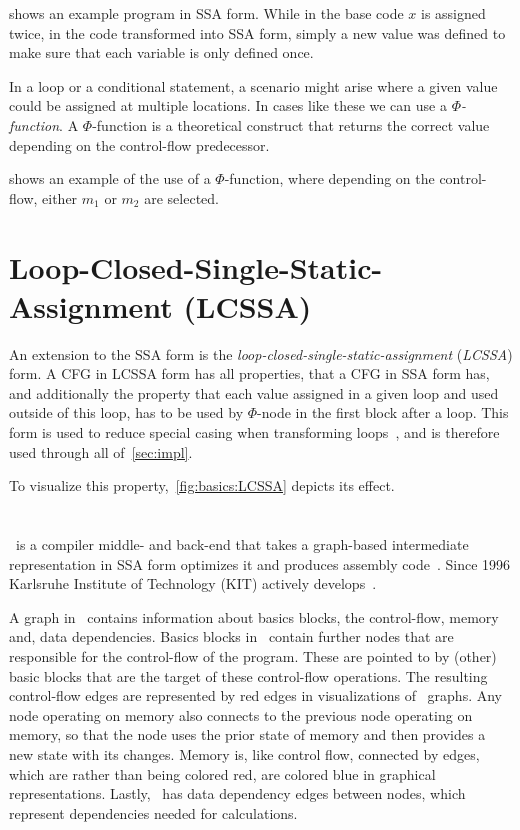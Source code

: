  shows an example program in SSA form.
While in the base code $x$ is assigned twice, in the code transformed into SSA form, simply a new value was defined to make sure that each variable is only defined once.



In a loop or a conditional statement, a scenario might arise where a given value could be assigned at multiple locations.
In cases like these we can use a \textit{$\Phi$-function}.
A $\Phi$-function is a theoretical construct that returns the correct value depending on the control-flow predecessor.

 shows an example of the use of a $\Phi$-function, where depending on the control-flow, either $m_1$ or $m_2$  are selected.



\section{Loop-Closed-Single-Static-Assignment (LCSSA)}\label{sec:basics:LCSSA}

An extension to the SSA form is the \textit{loop-closed-single-static-assignment} (\textit{LCSSA}) form.
A CFG in LCSSA form has all properties, that a CFG in SSA form has, and additionally the property that each value assigned in a given loop and used outside of this loop, has to be used by $\Phi$-node in the first block after a loop.
This form is used to reduce special casing when transforming loops~\cite{aebi18bachelorarbeit}, and is therefore used through all of~\cref{sec:impl}.

To visualize this property,~\cref{fig:basics:LCSSA} depicts its effect.



\section{\libFIRM}\label{sec:basics:firm}

\libFIRM~is a compiler middle- and back-end that takes a graph-based intermediate representation in SSA form optimizes it and produces assembly code~\cite{libfirm}.
Since 1996 Karlsruhe Institute of Technology (KIT) actively develops~\libFIRM.

A graph in \libFIRM~contains information about basics blocks, the control-flow, memory and, data dependencies.
Basics blocks in \libFIRM~contain further nodes that are responsible for the control-flow of the program.
These are pointed to by (other) basic blocks that are the target of these control-flow operations.
The resulting control-flow edges are represented by red edges in visualizations of \libFIRM~graphs.
Any node operating on memory also connects to the previous node operating on memory, so that the node uses the prior state of memory and then provides a new state with its changes.
Memory is, like control flow, connected by edges, which are rather than being colored red, are colored blue in graphical representations.
Lastly, \libFIRM~has data dependency edges between nodes, which represent dependencies needed for calculations.

